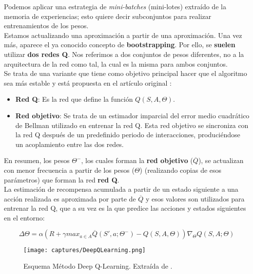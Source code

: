 \documentclass[11pt,fleqn]{book} %
\begin{document}
Podemos aplicar una estrategia de \textit{mini-batches} (mini-lotes) extraído de la memoria de experiencias; esto quiere decir subconjuntos para realizar entrenamientos de los pesos.  \\

Estamos actualizando una aproximación a partir de una aproximación. Una vez más, aparece el ya conocido concepto de \textbf{bootstrapping}. Por ello, se \textbf{suelen} utilizar \textbf{dos redes Q}. Nos referimos a dos conjuntos de pesos diferentes, no a la arquitectura de la red como tal, la cual es la misma para ambos conjuntos. \\

Se trata de una variante que tiene como objetivo principal hacer que el algoritmo sea más estable y está propuesta en el artículo original \cite{article:DQN}: \\

\begin{itemize}
	\item \textbf{Red Q}: Es la red que define la función $Q(S,A,\Theta)$.\\
	
	\item \textbf{Red objetivo}: Se trata de un estimador imparcial del error medio cuadrático de Bellman utilizado en entrenar la red Q. Esta red objetivo se sincroniza con la red Q después de un predefinido periodo de interacciones, produciéndose un acoplamiento entre las dos redes. \\
\end{itemize}

En resumen, los pesos $\Theta^-$, los cuales forman la \textbf{red objetivo} ($\overline{Q}$), se actualizan con menor frecuencia a partir de los pesos ($\Theta$) (realizando copias de esos parámetros) que forman la red \textbf{red Q}. \\
	
La estimación de recompensa acumulada a partir de un estado siguiente a una acción realizada es aproximada por parte de $\overline{Q}$ y esos valores son utilizados para entrenar la red Q, que a su vez es la que predice las acciones y estados siguientes en el entorno:

\begin{equation}
\Delta\Theta=\alpha(R+\gamma max_{a \in A} \overline{Q}(S',a;\Theta^-)-Q(S,A,\Theta))\nabla_\Theta Q(S,A;\Theta)
\end{equation}

\begin{figure}[H]
	\centering\texttt{[image: captures/DeepQLearning.png]}
	\caption{Esquema Método Deep Q-Learning. Extraída de \cite{book:barto} \cite{article:RLromero}.}
	\label{fig:deepqlearning} %
\end{figure}
\end{document}
